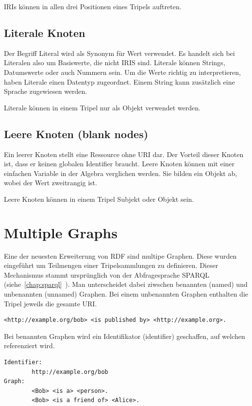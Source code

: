 IRIs können in allen drei Positionen eines Tripels auftreten.

\subsection{Literale Knoten}
\label{sec:rdf_rdf_dataModel_literal}
Der Begriff Literal wird als Synonym für Wert verwendet. Es handelt sich bei Literalen also um Basiswerte, die nicht IRIS sind. Literale können Strings, Datumswerte oder auch Nummern sein. Um die Werte richtig zu interpretieren, haben Literale einen Datentyp zugeordnet. Einem String kann zusätzlich eine Sprache zugewiesen werden.

Literale können in einem Tripel nur als Objekt verwendet werden.

\subsection{Leere Knoten (blank nodes)}
\label{sec:rdf_rdf_dataModel_blankNodes}
Ein leerer Knoten stellt eine Ressource ohne URI dar. Der Vorteil dieser Knoten ist, dass er keinen globalen Identifier braucht. Leere Knoten können mit einer einfachen Variable in der Algebra verglichen werden. Sie bilden ein Objekt ab, wobei der Wert zweitrangig ist.

Leere Knoten können in einem Tripel Subjekt oder Objekt sein.


\section{Multiple Graphs}
\label{sec:owlRdf_rdf_dataModel_multipleGraphs}
Eine der neuesten Erweiterung von RDF sind multipe Graphen. Diese wurden eingeführt um Teilmengen einer Tripelsammlungen zu definieren. Dieser Mechanismus stammt ursprünglich von der Abfragesprache SPARQL (siehe~\ref{chap:sparql}~). Man unterscheidet dabei ziwschen benannten (named) und unbenannten (unnamed) Graphen. Bei einem unbenannten Graphen enthalten die Tripel jeweils die gesamte URI.\@

\begin{lstlisting}[caption={Beispiel eines unbenannten (unnamed) Graphen}]
	<http://example.org/bob> <is published by> <http://example.org>.
\end{lstlisting}

Bei benannten Graphen wird ein Identifikator (identifier) geschaffen, auf welchen referenziert wird.

\begin{lstlisting}[caption={Beispiel eines benannten (named) Graphne}]
Identifier: 
		http://example.org/bob
Graph:
		<Bob> <is a> <person>.
		<Bob> <is a friend of> <Alice>.
\end{lstlisting}

